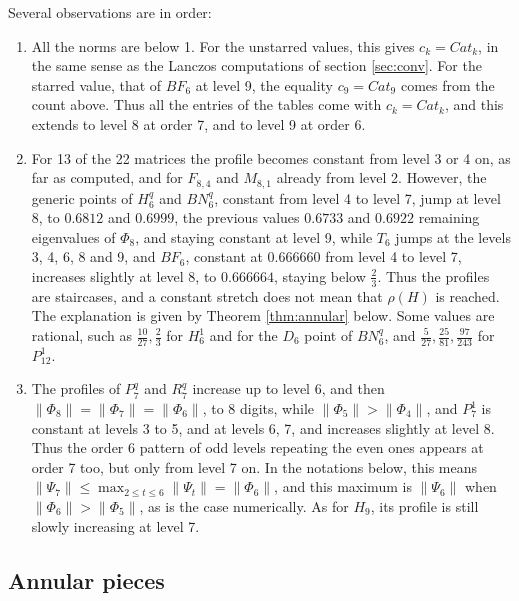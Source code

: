\documentclass[11pt]{amsart}
\begin{document}
\medskip

\noindent Several observations are in order:
\begin{enumerate}
\item All the norms are below 1. For the unstarred values, this gives $c_k=Cat_k$, in the same sense as the Lanczos computations of section \ref{sec:conv}. For the starred value, that of $BF_6$ at level 9, the equality $c_9=Cat_9$ comes from the count above. Thus all the entries of the tables come with $c_k=Cat_k$, and this extends to level 8 at order 7, and to level 9 at order 6.

\item For 13 of the 22 matrices the profile becomes constant from level 3 or 4 on, as far as computed, and for $F_{8,4}$ and $M_{8,1}$ already from level 2. However, the generic points of $H_6^q$ and $BN_6^q$, constant from level 4 to level 7, jump at level 8, to $0.6812$ and $0.6999$, the previous values $0.6733$ and $0.6922$ remaining eigenvalues of $\Phi_8$, and staying constant at level 9, while $T_6$ jumps at the levels 3, 4, 6, 8 and 9, and $BF_6$, constant at $0.666660$ from level 4 to level 7, increases slightly at level 8, to $0.666664$, staying below $\frac{2}{3}$. Thus the profiles are staircases, and a constant stretch does not mean that $\rho(H)$ is reached. The explanation is given by Theorem \ref{thm:annular} below. Some values are rational, such as $\frac{10}{27},\frac{2}{3}$ for $H_6^1$ and for the $D_6$ point of $BN_6^q$, and $\frac{5}{27},\frac{25}{81},\frac{97}{243}$ for $P_{12}^1$.

\item The profiles of $P_7^q$ and $R_7^q$ increase up to level 6, and then $\|\Phi_8\|=\|\Phi_7\|=\|\Phi_6\|$, to 8 digits, while $\|\Phi_5\|>\|\Phi_4\|$, and $P_7^1$ is constant at levels 3 to 5, and at levels 6, 7, and increases slightly at level 8. Thus the order 6 pattern of odd levels repeating the even ones appears at order 7 too, but only from level 7 on. In the notations below, this means $\|\Psi_7\|\leq\max_{2\leq t\leq6}\|\Psi_t\|=\|\Phi_6\|$, and this maximum is $\|\Psi_6\|$ when $\|\Phi_6\|>\|\Phi_5\|$, as is the case numerically. As for $H_9$, its profile is still slowly increasing at level 7.
\end{enumerate}

\medskip

\subsection{Annular pieces}
\end{document}
